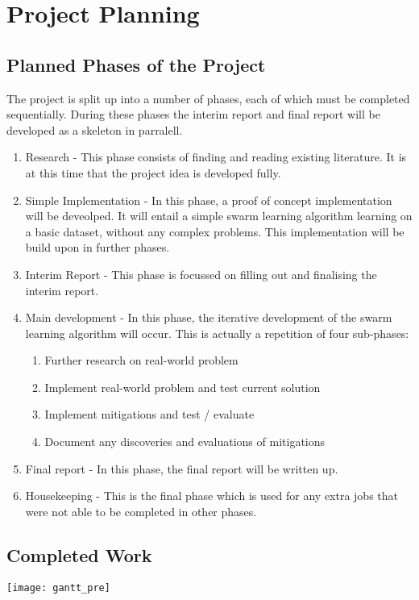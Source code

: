 \chapter{Project Planning}

\section{Planned Phases of the Project}
The project is split up into a number of phases, each of which must be completed sequentially. During these phases the interim report and final report will be developed as a skeleton in parralell.
\begin{enumerate}
	\item Research - This phase consists of finding and reading existing literature. It is at this time that the project idea is developed fully.
	\item Simple Implementation - In this phase, a proof of concept implementation will be deveolped. It will entail a simple swarm learning algorithm learning on a basic dataset, without any complex problems. This implementation will be build upon in further phases.
	\item Interim Report - This phase is focussed on filling out and finalising the interim report.
	\item Main development - In this phase, the iterative development of the swarm learning algorithm will occur. This is actually a repetition of four sub-phases:
	\begin{enumerate}
		\item Further research on real-world problem
		\item Implement real-world problem and test current solution
		\item Implement mitigations and test / evaluate
		\item Document any discoveries and evaluations of mitigations
	\end{enumerate}
	\item Final report - In this phase, the final report will be written up.
	\item Housekeeping - This is the final phase which is used for any extra jobs that were not able to be completed in other phases.
\end{enumerate}



\section{Completed Work}
\texttt{[image: gantt\_pre]}



